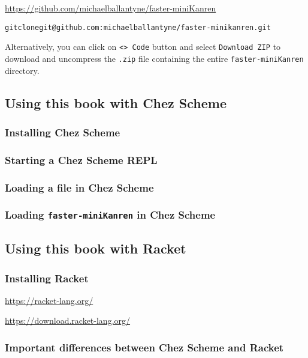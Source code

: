 \documentclass{book}
\begin{document}
\url{https://github.com/michaelballantyne/faster-miniKanren}

\begin{alltt}
git clone git@github.com:michaelballantyne/faster-minikanren.git
\end{alltt}

Alternatively, you can click on \verb|<> Code| button and select \verb|Download ZIP| to download and uncompress the \texttt{.zip} file containing the entire \texttt{faster-miniKanren} directory.


\subsection{Using this book with Chez Scheme}

\subsubsection{Installing Chez Scheme}

\subsubsection{Starting a Chez Scheme REPL}

\subsubsection{Loading a file in Chez Scheme}

\subsubsection{Loading \texttt{faster-miniKanren} in Chez Scheme}


\subsection{Using this book with Racket}

\subsubsection{Installing Racket}

\url{https://racket-lang.org/}

\url{https://download.racket-lang.org/}

\subsubsection{Important differences between Chez Scheme and Racket}
\end{document}
